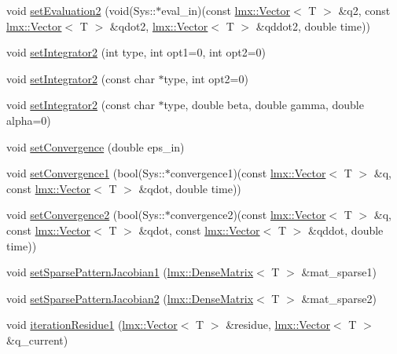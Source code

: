 \begin{DoxyCompactItemize}
\item 
void \hyperlink{classlmx_1_1DiffProblemFirstSecond_a38a3d5cafeb79df6004e6ef8dc9b317c}{set\-Evaluation2} (void(Sys\-::$\ast$eval\-\_\-in)(const \hyperlink{classlmx_1_1Vector}{lmx\-::\-Vector}$<$ T $>$ \&q2, const \hyperlink{classlmx_1_1Vector}{lmx\-::\-Vector}$<$ T $>$ \&qdot2, \hyperlink{classlmx_1_1Vector}{lmx\-::\-Vector}$<$ T $>$ \&qddot2, double time))
\item 
void \hyperlink{classlmx_1_1DiffProblemFirstSecond_adf23a7f06746aabc2f0afbf3a590972b}{set\-Integrator2} (int type, int opt1=0, int opt2=0)
\item 
void \hyperlink{classlmx_1_1DiffProblemFirstSecond_a5bac9fb7adce7af6a029947469f33e77}{set\-Integrator2} (const char $\ast$type, int opt2=0)
\item 
void \hyperlink{classlmx_1_1DiffProblemFirstSecond_ae2a7afa90a734754473c9eb5a7d0b56c}{set\-Integrator2} (const char $\ast$type, double beta, double gamma, double alpha=0)
\item 
void \hyperlink{classlmx_1_1DiffProblemFirstSecond_afa3fe69f4ba28e4f21866017a253053f}{set\-Convergence} (double eps\-\_\-in)
\item 
void \hyperlink{classlmx_1_1DiffProblemFirstSecond_a99b5a3a72f0e25a58c34f1ae4c6b0df5}{set\-Convergence1} (bool(Sys\-::$\ast$convergence1)(const \hyperlink{classlmx_1_1Vector}{lmx\-::\-Vector}$<$ T $>$ \&q, const \hyperlink{classlmx_1_1Vector}{lmx\-::\-Vector}$<$ T $>$ \&qdot, double time))
\item 
void \hyperlink{classlmx_1_1DiffProblemFirstSecond_afd1e0e6f871d3c34d9021004d576d2aa}{set\-Convergence2} (bool(Sys\-::$\ast$convergence2)(const \hyperlink{classlmx_1_1Vector}{lmx\-::\-Vector}$<$ T $>$ \&q, const \hyperlink{classlmx_1_1Vector}{lmx\-::\-Vector}$<$ T $>$ \&qdot, const \hyperlink{classlmx_1_1Vector}{lmx\-::\-Vector}$<$ T $>$ \&qddot, double time))
\item 
void \hyperlink{classlmx_1_1DiffProblemFirstSecond_ae56a582d46ca18f5c1c7d8d74b469144}{set\-Sparse\-Pattern\-Jacobian1} (\hyperlink{classlmx_1_1DenseMatrix}{lmx\-::\-Dense\-Matrix}$<$ T $>$ \&mat\-\_\-sparse1)
\item 
void \hyperlink{classlmx_1_1DiffProblemFirstSecond_a359944b699d9c45363f65b1f6f06a634}{set\-Sparse\-Pattern\-Jacobian2} (\hyperlink{classlmx_1_1DenseMatrix}{lmx\-::\-Dense\-Matrix}$<$ T $>$ \&mat\-\_\-sparse2)
\item 
void \hyperlink{classlmx_1_1DiffProblemFirstSecond_afcae2efbd94c9145554b6a5dfaf6e995}{iteration\-Residue1} (\hyperlink{classlmx_1_1Vector}{lmx\-::\-Vector}$<$ T $>$ \&residue, \hyperlink{classlmx_1_1Vector}{lmx\-::\-Vector}$<$ T $>$ \&q\-\_\-current)

\end{DoxyCompactItemize}
